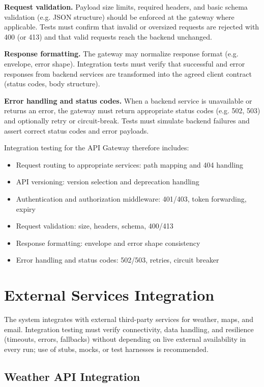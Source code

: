 \textbf{Request validation.}
Payload size limits, required headers, and basic schema validation (e.g. JSON structure) should be enforced at the gateway where applicable. Tests must confirm that invalid or oversized requests are rejected with 400 (or 413) and that valid requests reach the backend unchanged.

\textbf{Response formatting.}
The gateway may normalize response format (e.g. envelope, error shape). Integration tests must verify that successful and error responses from backend services are transformed into the agreed client contract (status codes, body structure).

\textbf{Error handling and status codes.}
When a backend service is unavailable or returns an error, the gateway must return appropriate status codes (e.g. 502, 503) and optionally retry or circuit-break. Tests must simulate backend failures and assert correct status codes and error payloads.

Integration testing for the API Gateway therefore includes:
\begin{itemize}
    \item Request routing to appropriate services: path mapping and 404 handling
    \item API versioning: version selection and deprecation handling
    \item Authentication and authorization middleware: 401/403, token forwarding, expiry
    \item Request validation: size, headers, schema, 400/413
    \item Response formatting: envelope and error shape consistency
    \item Error handling and status codes: 502/503, retries, circuit breaker
\end{itemize}

\section{External Services Integration}
\label{sec:external_services_integration}%

The system integrates with external third-party services for weather, maps, and email. Integration testing must verify connectivity, data handling, and resilience (timeouts, errors, fallbacks) without depending on live external availability in every run; use of stubs, mocks, or test harnesses is recommended.

\subsection{Weather API Integration}
\label{subsec:weather_api_integration}%

